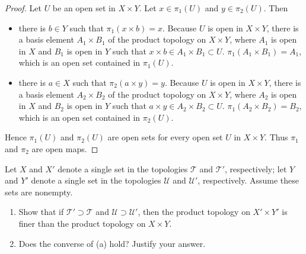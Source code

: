 \begin{proof}
    Let $U$ be an open set in $X\times Y$. Let $x\in \pi_{1}(U)$ and $y\in \pi_{2}(U)$. Then
    \begin{itemize}[itemsep=0pt]
        \item there is $b\in Y$ such that $\pi_{1}(x\times b) = x$. Because $U$ is open in $X\times Y$, there is a basis element $A_{1}\times B_{1}$ of the product topology on $X\times Y$, where $A_{1}$ is open in $X$ and $B_{1}$ is open in $Y$ such that $x\times b\in A_{1}\times B_{1}\subset U$. $\pi_{1}(A_{1}\times B_{1}) = A_{1}$, which is an open set contained in $\pi_{1}(U)$.
        \item there is $a\in X$ such that $\pi_{2}(a\times y) = y$. Because $U$ is open in $X\times Y$, there is a basis element $A_{2}\times B_{2}$ of the product topology on $X\times Y$, where $A_{2}$ is open in $X$ and $B_{2}$ is open in $Y$ such that $a\times y\in A_{2}\times B_{2}\subset U$. $\pi_{1}(A_{2}\times B_{2}) = B_{2}$, which is an open set contained in $\pi_{2}(U)$.
    \end{itemize}

    Hence $\pi_{1}(U)$ and $\pi_{2}(U)$ are open sets for every open set $U$ in $X\times Y$. Thus $\pi_{1}$ and $\pi_{2}$ are open maps.
\end{proof}

\begin{exercise}\label{chapter2:section16:exercise5}
    Let $X$ and $X'$ denote a single set in the topologies $\mathscr{T}$ and $\mathscr{T}'$, respectively; let $Y$ and $Y'$ denote a single set in the topologies $\mathscr{U}$ and $\mathscr{U}'$, respectively. Assume these sets are nonempty.
    \begin{enumerate}[label={(\alph*)}]
        \item Show that if $\mathscr{T}'\supset\mathscr{T}$ and $\mathscr{U}\supset\mathscr{U}'$, then the product topology on $X'\times Y'$ is finer than the product topology on $X\times Y$.
        \item Does the converse of (a) hold? Justify your answer.
    \end{enumerate}
\end{exercise}

